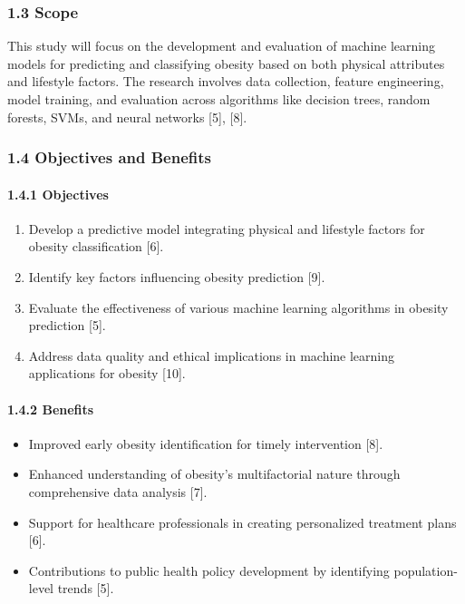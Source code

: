 \hypertarget{scope}{%
\subsubsection{1.3 Scope}\label{scope}}

This study will focus on the development and evaluation of machine
learning models for predicting and classifying obesity based on both
physical attributes and lifestyle factors. The research involves data
collection, feature engineering, model training, and evaluation across
algorithms like decision trees, random forests, SVMs, and neural
networks {[}5{]}, {[}8{]}.

\hypertarget{objectives-and-benefits}{%
\subsubsection{1.4 Objectives and
Benefits}\label{objectives-and-benefits}}

\hypertarget{objectives}{%
\paragraph{1.4.1 Objectives}\label{objectives}}

\begin{enumerate}
\def\labelenumi{\arabic{enumi}.}
\tightlist
\item
  Develop a predictive model integrating physical and lifestyle factors
  for obesity classification {[}6{]}.
\item
  Identify key factors influencing obesity prediction {[}9{]}.
\item
  Evaluate the effectiveness of various machine learning algorithms in
  obesity prediction {[}5{]}.
\item
  Address data quality and ethical implications in machine learning
  applications for obesity {[}10{]}.
\end{enumerate}

\hypertarget{benefits}{%
\paragraph{1.4.2 Benefits}\label{benefits}}

\begin{itemize}
\tightlist
\item
  Improved early obesity identification for timely intervention {[}8{]}.
\item
  Enhanced understanding of obesity's multifactorial nature through
  comprehensive data analysis {[}7{]}.
\item
  Support for healthcare professionals in creating personalized
  treatment plans {[}6{]}.
\item
  Contributions to public health policy development by identifying
  population-level trends {[}5{]}.
\end{itemize}

